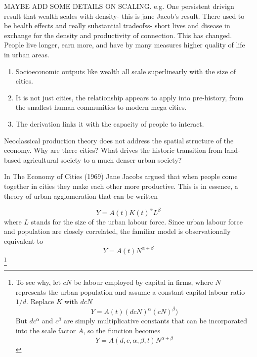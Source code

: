 MAYBE ADD SOME DETAILS ON SCALING. e.g.
One persistent drivign result that wealth scales with density- this is jane Jacob's result. 
There used to be health effects and really substantial tradeofss- short lives and disease in exchange for the density and productivity of connection. This has changed. People live longer, earn more, and have by many measures higher quality of life in urban areas. 
\begin{enumerate}
 \item Socioeconomic outputs like wealth all scale superlinearly with the size of cities. 
\item It is not just cities, the relationship appears to apply into pre-history, from the smallest human communities to modern mega cities. %
\item The derivation links it with the capacity of people to interact.
\end{enumerate}



Neoclassical production theory does not address the spatial structure of the economy. Why are there cities? What drives the historic transition from land-based agricultural society to a much denser urban society? 

In The Economy of Cities (1969) Jane Jacobs argued that when people come together in cities they make each other more productive. This is in essence, a theory of urban agglomeration that can be written

\begin{equation}
Y = A(t) K(t)^\alpha L^\beta 
\label{eqn-production-jacobs}
\end{equation}
where $L$ stands for the size of the urban labour force. Since urban labour force and population are closely correlated, the familiar model is observationally equivalent to
\begin{equation}
Y = A(t)N^{\alpha+\beta}
\label{eqn-production-jacobs-2}
\end{equation}
\footnote{ To see why, let  $cN$ be labour employed by capital in firms, where $N$ represents the urban population and assume a constant capital-labour ratio $1/d$. Replace $K$ with $dcN$
\[Y = A(t) (dcN)^\alpha (cN)^\beta) \]
But  $dc^\alpha$ and $c^\beta$ are simply multiplicative constants that can be incorporated into the scale factor $A$, so the function becomes 
\[Y = A(d, c,\alpha, \beta, t)N^{\alpha+\beta}\]
}

